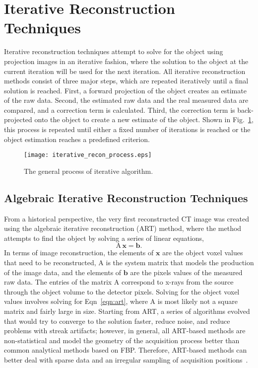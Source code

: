 \section{Iterative Reconstruction Techniques}
Iterative reconstruction techniques attempt to solve for the object using projection images in an iterative fashion, where the solution to the object at the current iteration will be used for the next iteration.  All iterative reconstruction methods consist of three major steps, which are repeated iteratively until a final solution is reached.  First, a forward projection of the object creates an estimate of the raw data.  Second, the estimated raw data and the real measured data are compared, and a correction term is calculated.  Third, the correction term is back-projected onto the object to create a new estimate of the object.  Shown in Fig.~\ref{fig:generalIR}, this process is repeated until either a fixed number of iterations is reached or the object estimation reaches a predefined criterion.
%
\begin{figure}
\centering
\texttt{[image: iterative\_recon\_process.eps]}
\caption[]{The general process of iterative algorithm\footnotemark.}
\label{fig:generalIR}
\end{figure}

\subsection{Algebraic Iterative Reconstruction Techniques}
From a historical perspective, the very first reconstructed CT image was created using the algebraic iterative reconstruction (ART) method, where the method attempts to find the object by solving a series of linear equations,
%
\begin{equation}
\mathrm{A\,\mathbf{x} = \mathbf{b}}.
\label{eqn:art}
\end{equation}
%
In terms of image reconstruction, the elements of $\mathrm{\mathbf{x}}$ are the object voxel values that need to be reconstructed, $\mathrm{A}$ is the system matrix that models the production of the image data, and the elements of $\mathrm{\mathbf{b}}$ are the pixels values of the measured raw data.  The entries of the matrix $\mathrm{A}$ correspond to x-rays from the source through the object volume to the detector pixels.  Solving for the object voxel values involves solving for Eqn~\ref{eqn:art}, where $\mathrm{A}$ is most likely not a square matrix and fairly large in size.  Starting from ART, a series of algorithms evolved that would try to converge to the solution faster, reduce noise, and reduce problems with streak artifacts; however, in general, all ART-based methods are non-statistical and model the geometry of the acquisition process better than common analytical methods based on FBP.  Therefore, ART-based methods can better deal with sparse data and an irregular sampling of acquisition positions~\citep{Beister2012}.

